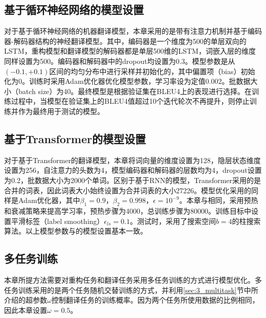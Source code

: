 \subsection{基于循环神经网络的模型设置}
\label{sec:3_rnn_setup}
对于基于循环神经网络的机器翻译模型，本章采用的是带有注意力机制并基于编码器-解码器结构的神经翻译模型。其中，编码器是一个维度为500的单层双向的LSTM，重构模型和翻译模型的解码器都是单层500维的LSTM，词嵌入层的维度同样设置为500。编码器和解码器中的dropout均设置为0.3。模型参数是从$(-0.1,+0.1)$区间的均匀分布中进行采样并初始化的，其中偏置项（bias）初始化为0。训练时采用Adam优化器优化模型参数，学习率设为定值0.002。批数据大小（batch size）为40。最终模型是根据验证集在BLEU4上的表现进行选择。在训练过程中，当模型在验证集上的BLEU4值超过10个迭代轮次不再提升，则停止训练并作为最终用于测试的模型。

\subsection{基于Transformer的模型设置}
\label{sec:3_transformer_setup}
对于基于Transformer的翻译模型，本章将词向量的维度设置为128，隐层状态维度设置为256，自注意力的头数为4，模型编码器和解码器的层数均为4，dropout设置为0.2，批数据大小为2000个单词。区别于基于RNN的模型，Transformer采用的是合并的词表，因此词表大小始终设置为合并词表的大小27226。模型优化采用的同样是Adam优化器，其中$\beta_1=0.9$，$\beta_2=0.998$，$\epsilon=10^{-9}$。本章与相同，采用预热和衰减策略来提高学习率，预热步骤为4000，总训练步骤为80000。训练目标中设置平滑标签（label smoothing）$\epsilon_{ls}=0.1$。测试时，采用了搜索空间$b=4$的柱搜索算法。以上模型参数与的模型设置基本一致。

\subsection{多任务训练}
本章所提方法需要对重构任务和翻译任务采用多任务训练的方式进行模型优化。多任务训练采用的是两个任务随机交替训练的方式，并利用\ref{sec:3_multitask}节中所介绍的超参数$\omega$控制翻译任务的训练概率。因为两个任务所使用数据的比例相同，因此本章设置$\omega=0.5$。

